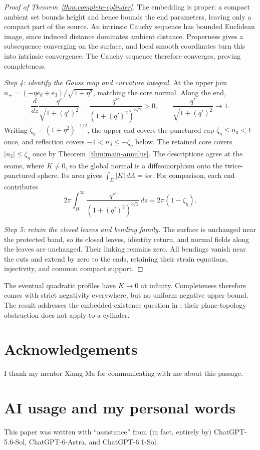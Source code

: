 \documentclass[11pt]{amsart}
\theoremstyle{definition}
\theoremstyle{remark}
\numberwithin{equation}{section}
\begin{document}
\begin{proof}[Proof of Theorem~\ref{thm:complete-cylinder}]
The embedding is proper: a compact ambient set bounds height and hence
bounds the end parameters, leaving only a compact part of the source.
An intrinsic Cauchy sequence has bounded Euclidean image, since induced
distance dominates ambient distance. Properness gives a subsequence
converging on the surface, and local smooth coordinates turn this into
intrinsic convergence. The Cauchy sequence therefore converges, proving
completeness.

\emph{Step 4: identify the Gauss map and curvature integral.}
At the upper join $n_+=(-\eta e_\theta+e_3)/\sqrt{1+\eta^2}$,
matching the core normal. Along the end,
\[
 \frac d{dz}\frac{q'}{\sqrt{1+(q')^2}}
 =\frac{q''}{(1+(q')^2)^{3/2}}>0,
 \qquad\frac{q'}{\sqrt{1+(q')^2}}\longrightarrow1.
\]
Writing $\zeta_\eta=(1+\eta^2)^{-1/2}$, the upper end covers the
punctured cap $\zeta_\eta\le n_3<1$ once, and reflection covers
$-1<n_3\le-\zeta_\eta$ below. The retained core covers
$|n_3|\le\zeta_\eta$ once by
Theorem~\ref{thm:main-annulus}. The descriptions agree at the seams,
where $K\ne0$, so the global normal is a diffeomorphism onto the
twice-punctured sphere. Its area gives $\int_\Sigma|K|\,dA=4\pi$.
For comparison, each end contributes
\[
 2\pi\int_H^\infty\frac{q''}{(1+(q')^2)^{3/2}}\,dz
 =2\pi(1-\zeta_\eta).
\]

\emph{Step 5: retain the closed leaves and bending family.}
The surface is unchanged near the protected band, so its closed leaves,
identity return, and normal fields along the leaves are unchanged.
Their linking remains zero. All bendings vanish near the cuts and extend
by zero to the ends, retaining their strain equations, injectivity, and
common compact support.
\end{proof}
The eventual quadratic profiles have $K\to0$ at infinity. Completeness
therefore comes with strict negativity everywhere, but no uniform negative
upper bound. The result addresses the embedded-existence question in
\cite[after Theorem~3.4]{NiZhangZhang}; their plane-topology obstruction
does not apply to a cylinder.


\section*{Acknowledgements}
I thank my mentor Xiang Ma for communicating with me about this passage.

\section*{AI usage and my personal words}
This paper was written with ``assistance'' from (in fact, entirely by)
ChatGPT-5.6-Sol, ChatGPT-6-Astra, and ChatGPT-6.1-Sol.
\end{document}
